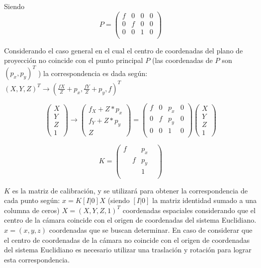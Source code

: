 Siendo
\[
P = 
\begin{pmatrix}
f & 0 & 0 & 0 \\
0 & f & 0 & 0 \\
0 & 0 & 1 & 0 \\
\end{pmatrix}
\]

Considerando el caso general en el cual el centro de coordenadas del plano de proyección no coincide con el punto principal $P$ (las coordenadas de $P$ son $(p_x,p_y)^T$ ) la correspondencia es dada según:
$(X,Y,Z)^T \to (\frac{fX}{Z} + p_x, \frac{fY}{Z} + p_y, f)^T$

\[
\begin{pmatrix}
X \\ Y \\ Z \\ 1
\end{pmatrix}
\to
\begin{pmatrix}
f_X + Z * p_x \\ f_Y + Z * p_y \\ Z
\end{pmatrix}
=
\begin{pmatrix}
f & 0 & p_x & 0 \\
0 & f & p_y & 0 \\
0 & 0 & 1 & 0 \\
\end{pmatrix}
\begin{pmatrix}
X \\ Y \\ Z \\ 1
\end{pmatrix}
\]

\[
K =
\begin{pmatrix}
f &   & p_x & \\
  & f & p_y & \\
  &   & 1   & \\
\end{pmatrix}
\]

$K$ es la matriz de calibración, y se utilizará para obtener la correspondencia de cada punto según:
$x = K [I|0] X$
(siendo $[I|0]$ la matriz identidad sumado a una columna de ceros)
$X = (X,Y,Z,1)^T$ coordenadas espaciales considerando que el centro de la cámara coincide con el origen de coordenadas del sistema Euclidiano.
$x = (x, y, z)$ coordenadas que se buscan determinar.
En caso de considerar que el centro de coordenadas de la cámara no coincide con el origen de coordenadas del sistema Euclidiano es necesario utilizar una traslación y rotación para lograr esta correspondencia\cite{LibroCompGrafica3}.

